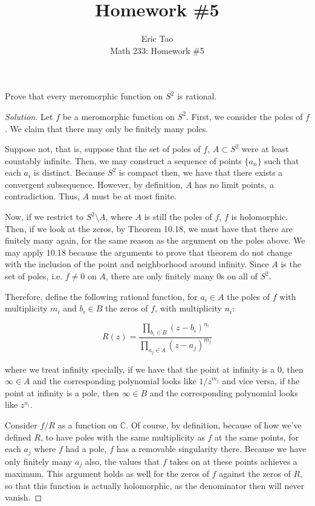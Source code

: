 \documentclass[10pt]{article}
\newenvironment{problem}[2][]{\begin{trivlist}
\item[\hskip \labelsep {\bfseries #1}\hskip \labelsep {\bfseries #2.}]}{\end{trivlist}}
\begin{document}
 
\title{Homework \#5}
\author{Eric Tao\\
Math 233: Homework \#5}
\maketitle

\begin{problem}{Question 1}

Prove that every meromorphic function on $S^2$ is rational.

\end{problem}
\begin{proof}[Solution]

Let $f$ be a meromorphic function on $S^2$. First, we consider the poles of $f$. We claim that there may only be finitely many poles.

Suppose not, that is, suppose that the set of poles of $f$, $A \subset S^2$ were at least countably infinite. Then, we may construct a sequence of points $\{a_n\}$ such that each $a_i$ is distinct. Because $S^2$ is compact then, we have that there exists a convergent subsequence. However, by definition, $A$ has no limit points, a contradiction. Thus, $A$ must be at most finite.

Now, if we restrict to $S^2 \setminus A$, where $A$ is still the poles of $f$, $f$ is holomorphic. Then, if we look at the zeros, by Theorem 10.18, we must have that there are finitely many again, for the same reason as the argument on the poles above. We may apply 10.18 because the arguments to prove that theorem do not change with the inclusion of the point and neighborhood around infinity. Since $A$ is the set of poles, i.e. $f \not = 0$ on $A$, there are only finitely many 0s on all of $S^2$.

Therefore, define the following rational function, for $a_i \in A$ the poles of $f$ with multiplicity $m_i$ and $b_i \in B$ the zeros of $f$, with multiplicity $n_i$:

$$ R(z) = \frac{\prod_{b_i \in B} (z - b_i)^{n_i}}{ \prod_{a_j \in A} (z - a_j)^{m_j}} $$

where we treat infinity specially, if we have that the point at infinity is a 0, then $\infty \in A$ and the corresponding polynomial looks like $1/z^{m_j}$ and vice versa, if the point at infinity is a pole, then $\infty \in B$ and the corresponding polynomial looks like $z^{n_i}$.

Consider $f/R$ as a function on $\mathbb{C}$. Of course, by definition, because of how we've defined $R$, to have poles with the same multiplicity as $f$ at the same points, for each $a_j$ where $f$ had a pole, $f$ has a removable singularity there. Because we have only finitely many $a_j$ also, the values that $f$ takes on at these points achieves a maximum. This argument holds as well for the zeros of $f$ against the zeros of $R$, so that this function is actually holomorphic, as the denominator then will never vanish.


\end{proof}
\end{document}
